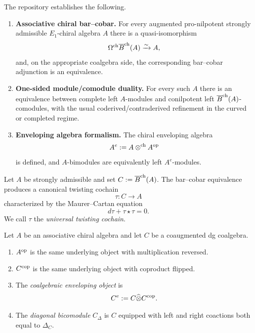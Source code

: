\begin{hypothesis}
\label{hyp:inputs}
The repository establishes the following.
\begin{enumerate}[label=(I)]
\item \textbf{Associative chiral bar--cobar.}
For every augmented pro-nilpotent strongly admissible $E_1$-chiral algebra $A$ there is a
quasi-isomorphism
\[
\Omega^{\mathrm{ch}} \overline{B}^{\mathrm{ch}}(A)\xrightarrow{\sim} A,
\]
and, on the appropriate coalgebra side, the corresponding bar--cobar adjunction is an equivalence.

\item \textbf{One-sided module/comodule duality.}
For every such $A$ there is an equivalence between complete left $A$-modules and conilpotent left
$\overline{B}^{\mathrm{ch}}(A)$-comodules, with the usual coderived/contraderived refinement in the curved or completed
regime.

\item \textbf{Enveloping algebra formalism.}
The chiral enveloping algebra
\[
A^e := A\mathbin{\otimes^{\mathrm{ch}}} A^{\mathrm{op}}
\]
is defined, and $A$-bimodules are equivalently left $A^e$-modules.
\end{enumerate}
\end{hypothesis}

\begin{definition}
Let $A$ be strongly admissible and set $C:=\overline{B}^{\mathrm{ch}}(A)$. The bar--cobar equivalence produces a
canonical twisting cochain
\[
\tau:C\to A
\]
characterized by the Maurer--Cartan equation
\[
d\tau+\tau\star\tau=0.
\]
We call $\tau$ the \emph{universal twisting cochain}.
\end{definition}

\begin{definition}
Let $A$ be an associative chiral algebra and let $C$ be a coaugmented dg coalgebra.
\begin{enumerate}[label=(\alph*)]
\item $A^{\mathrm{op}}$ is the same underlying object with multiplication reversed.
\item $C^{\mathrm{cop}}$ is the same underlying object with coproduct flipped.
\item The \emph{coalgebraic enveloping object} is
\[
C^e:=C\widehat\otimes C^{\mathrm{cop}}.
\]
\item The \emph{diagonal bicomodule} $C_\Delta$ is $C$ equipped with left and right coactions both
equal to $\Delta_C$.
\end{enumerate}
\end{definition}

